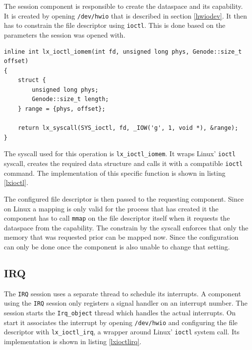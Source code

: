 \documentclass[
a4paper,
11pt,
twoside
]{report}
\begin{document}
		The session component is responsible to create the dataspace and its capability.
		It is created by opening \texttt{/dev/hwio} that is described in section \ref{hwiodev}.
		It then has to constrain the file descriptor using \texttt{ioctl}.
		This is done based on the parameters the session was opened with.
		
		\begin{lstlisting}[basicstyle=\ttfamily\footnotesize]
inline int lx_ioctl_iomem(int fd, unsigned long phys, Genode::size_t offset)
{
	struct {
		unsigned long phys;
		Genode::size_t length;
	} range = {phys, offset};

	return lx_syscall(SYS_ioctl, fd, _IOW('g', 1, void *), &range);
}
		\end{lstlisting}
		
		The syscall used for this operation is \texttt{lx\_ioctl\_iomem}.
		It wraps Linux' \texttt{ioctl} syscall, creates the required data structure and calls it with a compatible \texttt{ioctl} command.
		The implementation of this specific function is shown in listing \ref{lxioctl}.
		
		The configured file descriptor is then passed to the requesting component.
		Since on Linux a mapping is only valid for the process that has created it the component has to call \texttt{mmap} on the file descriptor itself when it requests the dataspace from the capability.
		The constrain by the syscall enforces that only the memory that was requested prior can be mapped now.
		Since the configuration can only be done once the component is also unable to change that setting.
		
		\subsection{IRQ}
		
		The \texttt{IRQ} session uses a separate thread to schedule its interrupts.
		A component using the \texttt{IRQ} session only registers a signal handler on an interrupt number.
		The session starts the \texttt{Irq\_object} thread which handles the actual interrupts.
		On start it associates the interrupt by opening \texttt{/dev/hwio} and configuring the file descriptor with \texttt{lx\_ioctl\_irq}, a wrapper around Linux' \texttt{ioctl} system call.
		Its implementation is shown in listing \ref{lxioctlirq}.
		
\end{document}
